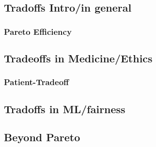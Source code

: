 \subsection{Tradoffs Intro/in general}
\subsubsection{Pareto Efficiency}
\subsection{Tradeoffs in Medicine/Ethics}
\subsubsection{Patient-Tradeoff}
\subsection{Tradoffs in ML/fairness}
\subsubsection{}
\subsection{Beyond Pareto}
